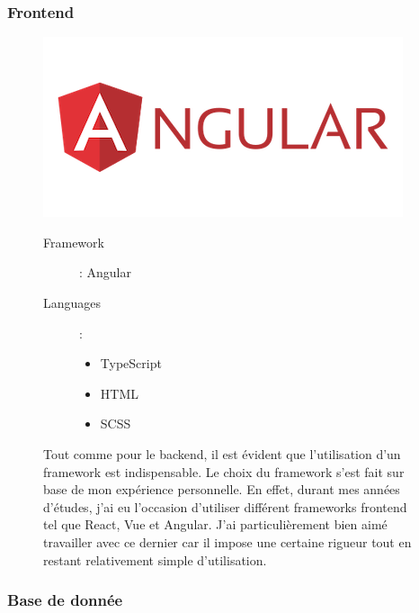 \subsubsection{Frontend}
\begin{figure}[H]
  \begin{minipage}{.3\textwidth}
    \includegraphics[width=0.75\linewidth]{img/tech/Angular.png}
  \end{minipage}
  \begin{minipage}{.7\textwidth}
    \begin{description}
      \item[Framework]: Angular
      \item[Languages]: \begin{itemize}
        \item TypeScript
        \item HTML
        \item SCSS
      \end{itemize} 
    \end{description}
    Tout comme pour le backend, il est évident que l'utilisation d'un framework est indispensable. Le choix du framework s'est fait sur base de mon expérience personnelle. En effet, durant mes années d'études, j'ai eu l'occasion d'utiliser différent frameworks frontend tel que React, Vue et Angular. J'ai particulièrement bien aimé travailler avec ce dernier car il impose une certaine rigueur tout en restant relativement simple d'utilisation.
  \end{minipage}
\end{figure}

\newpage

\subsubsection{Base de donnée}

